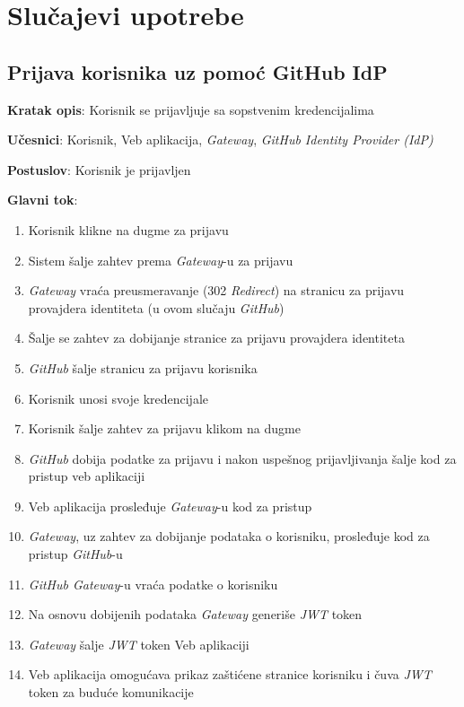 \chapter{Slučajevi upotrebe}\label{ch:slucajevi_upotrebe}

\renewcommand{\labelenumii}{\arabic{enumi}.\arabic{enumii}}
\renewcommand{\labelenumiii}{\arabic{enumi}.\arabic{enumii}.\arabic{enumiii}}
\renewcommand{\labelenumiv}{\arabic{enumi}.\arabic{enumii}.\arabic{enumiii}.\arabic{enumiv}}

\section{Prijava korisnika uz pomoć GitHub IdP}

\textbf{Kratak opis}: Korisnik se prijavljuje sa sopstvenim kredencijalima

\textbf{Učesnici}: Korisnik, Veb aplikacija, \textit{Gateway}, \textit{GitHub Identity Provider (IdP)}

\textbf{Postuslov}: Korisnik je prijavljen

\textbf{Glavni tok}:
\begin{enumerate}
    \item Korisnik klikne na dugme za prijavu
    \item Sistem šalje zahtev prema \textit{Gateway}-u za prijavu
    \item \textit{Gateway} vraća preusmeravanje (302 \textit{Redirect}) na stranicu za prijavu 
    provajdera identiteta (u ovom slučaju \textit{GitHub})
    \item Šalje se zahtev za dobijanje stranice za prijavu provajdera 
    identiteta
    \item \textit{GitHub} šalje stranicu za prijavu korisnika
    \item Korisnik unosi svoje kredencijale
    \item Korisnik šalje zahtev za prijavu klikom na dugme
    \item \textit{GitHub} dobija podatke za prijavu i nakon uspešnog prijavljivanja 
    šalje kod za pristup veb aplikaciji
    \item Veb aplikacija prosleđuje \textit{Gateway}-u kod za pristup
    \item \textit{Gateway}, uz zahtev za dobijanje podataka o korisniku, prosleđuje 
    kod za pristup \textit{GitHub}-u 
    \item \textit{GitHub Gateway}-u vraća podatke o korisniku
    \item Na osnovu dobijenih podataka \textit{Gateway} generiše \textit{JWT} token
    \item \textit{Gateway} šalje \textit{JWT} token Veb aplikaciji
    \item Veb aplikacija omogućava prikaz zaštićene stranice korisniku 
    i čuva \textit{JWT} token za buduće komunikacije
\end{enumerate}

